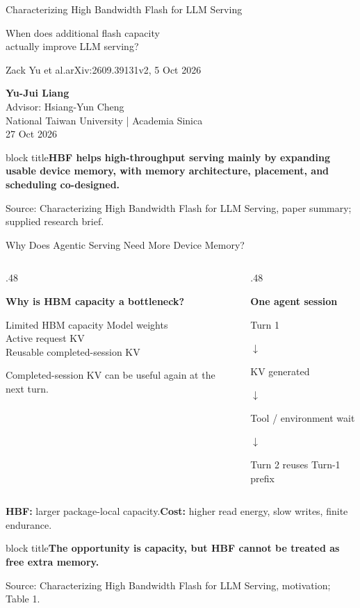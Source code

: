 \documentclass[aspectratio=169,10pt]{beamer}
\newcommand{\takeaway}[1]{\par\vspace{.12cm}\begin{beamercolorbox}[rounded=true,sep=.12cm,wd=\linewidth]{block title}\small\bfseries #1\end{beamercolorbox}}
\newcommand{\src}[1]{\par\vfill{\fontsize{7}{8}\selectfont\color{Muted}Source: Characterizing High Bandwidth Flash for LLM Serving, #1.}\par}
\newcommand{\head}[1]{\par{\color{Accent}\bfseries #1}\par\smallskip}
\begin{document}
\begin{frame}[t]{Characterizing High Bandwidth Flash for LLM Serving}

\par\vspace{.12cm}
{\Large\color{Accent}When does additional flash capacity\\actually improve LLM serving?\par}
\vspace{.3cm}
Zack Yu et al.\quad arXiv:2609.39131v2, 5 Oct 2026\par
\vspace{.35cm}
\textbf{Yu-Jui Liang}\\[.08cm]
Advisor: Hsiang-Yun Cheng\\[.08cm]
National Taiwan University | Academia Sinica\\[.08cm]
27 Oct 2026
\vspace{.25cm}
\takeaway{HBF helps high-throughput serving mainly by expanding usable device memory, with memory architecture, placement, and scheduling co-designed.}

\src{paper summary; supplied research brief}
\end{frame}

\begin{frame}[t]{Why Does Agentic Serving Need More Device Memory?}

\begin{columns}[T,onlytextwidth]
\begin{column}{.48\textwidth}
\head{Why is HBM capacity a bottleneck?}
\begin{block}{Limited HBM capacity}
Model weights\\[.16cm]
Active request KV\\[.16cm]
Reusable completed-session KV
\end{block}
\small Completed-session KV can be useful again at the next turn.
\end{column}
\begin{column}{.48\textwidth}
\head{One agent session}
\centering Turn 1\par $\downarrow$\par KV generated\par $\downarrow$\par Tool / environment wait\par $\downarrow$\par Turn 2 reuses Turn-1 prefix
\end{column}
\end{columns}
\vspace{.2cm}
\textbf{HBF:} larger package-local capacity.\quad\textbf{Cost:} higher read energy, slow writes, finite endurance.
\takeaway{The opportunity is capacity, but HBF cannot be treated as free extra memory.}

\src{motivation; Table 1}
\end{frame}
\end{document}
